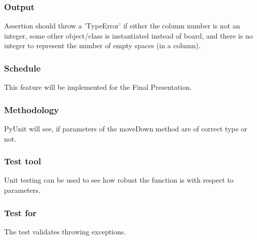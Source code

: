 \documentclass[12pt]{article}
\begin{document}
\subsubsection{Output}
Assertion should throw a 'TypeError' if either the column number is not an integer, some other object/class is instantiated instead of board, and there is no integer to represent the number of empty spaces (in a column).
\subsubsection{Schedule}
This feature will be implemented for the Final Presentation.
\subsubsection{Methodology}
PyUnit will see, if parameters of the moveDown method are of correct type or not. 
\subsubsection{Test tool}
Unit testing can be used to see how robust the function is with respect to parameters.
\subsubsection{Test for}
The test validates throwing exceptions.
\end{document}
